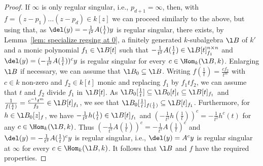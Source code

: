 \documentclass[a4paper, 11pt]{article}
\begin{document}
\begin{proof}
	 If $\infty$ is only regular singular, i.e., $p_{d+1}=\infty$, then, with $f=(z-p_1)\ldots(z-p_d)\in k[z]$ we can proceed similarly to the above, but using that, as $\del(y)=-\frac{1}{t^2}A(\frac{1}{t})y$ is regular singular, there exists, by Lemma~\ref{lem: specialize regsing at 0}, a finitely generated $k$-subalgebra $\l B$ of $k'$ and a monic polynomial $f_1\in\l B[t]$ such that $-\frac{1}{t^2}A(\frac{1}{t})\in \l B[t]_{f_1}^{n\times n}$ and $\del(y)=(-\frac{1}{t^2}A(\frac{1}{t}))^cy$ is regular singular for every $c\in\Hom_k(\l B,k)$. Enlarging $\l B$ if necessary, we can assume that $\l B_0\subseteq \l B$.  Writing $f(\frac{1}{t})=\frac{cf_2}{t^m}$ with $c\in k$ non-zero and $f_2\in k[t]$ monic and replacing $f_1$ by $f_1tf_2$, we can assume that $t$ and $f_2$ divide $f_1$ in $\l B[t]$. As $\l B_0[\frac{1}{t}]\subseteq \l B_0[t]_t\subseteq \l B[t]_{f_1}$ and $\frac{1}{f(\frac{1}{t})}=\frac{c^{-1}t^m}{f_2}\in \l B[t]_{f_1}$, we see that $\l B_0[\frac{1}{t}]_{f(\frac{1}{t})}\subseteq \l B[t]_{f_1}$. Furthermore, for $h\in\l B_0[z]_f$, we have $-\frac{1}{t^2}h(\frac{1}{t})\in\l B[t]_{f_1}$ and $\left(-\frac{1}{t^2}h(\frac{1}{t})\right)^c=-\frac{1}{t^2}h^c(t)$ for any $c\in\Hom_k(\l B,k)$. Thus $\left(-\frac{1}{t^2}A(\frac{1}{t})\right)^c=-\frac{1}{t^2}A(\frac{1}{t})^c$ and  $\del(y)=-\frac{1}{t^2}A(\frac{1}{t})^cy$ is regular singular, i.e., $\del(y)=A^cy$ is regular singular at $\infty$ for every $c\in\Hom_k(\l B,k)$. It follows that $\l B$ and $f$ have the required properties.
%	 
%	 
%	 
%	 
%	 
%	

\end{proof}
\end{document}

